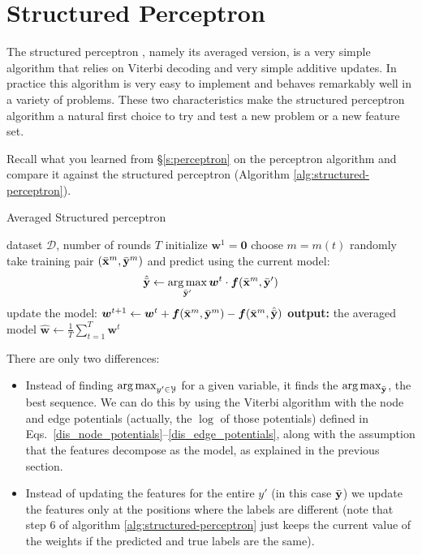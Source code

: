 \section{\label{s:spercetron}Structured Perceptron}

The structured perceptron \citep{collins2002discriminative}, namely its averaged version, is a very simple
algorithm that relies on Viterbi decoding and very simple additive
updates. In practice this algorithm is very easy to implement and
behaves remarkably well in a variety of problems. These two
characteristics make the structured perceptron algorithm a natural
first choice to try and test a new problem or a new feature set. 

Recall what you learned from \S\ref{s:perceptron} on the
perceptron algorithm and compare it against the structured perceptron
(Algorithm \ref{alg:structured-perceptron}). 

\begin{algorithm}[t]
   \caption{Averaged Structured perceptron \label{alg:structured-perceptron}}
\begin{algorithmic}[1]
    dataset $\mathcal{D}$, number of rounds $T$
   \STATE initialize $\boldsymbol{w}^1 = \mathbf{0}$
	\STATE choose $m = m(t)$ randomly
	\STATE take training pair $(\bar{\mathbf{x}}^m, \bar{\mathbf{y}}^m)$ and predict using the current model: 
	$$\hat{\bar{\mathbf{y}}}  \leftarrow \operatorname*{arg\,max}_{\bar{\mathbf{y}}'} \boldsymbol{w}^t \cdot \boldsymbol{f}(\bar{\mathbf{x}}^m,\bar{\mathbf{y}}')$$
	\STATE update the model: 
	$\boldsymbol{w}^{t+1} \leftarrow \boldsymbol{w}^{t} + \boldsymbol{f}(\bar{\mathbf{x}}^m,\bar{\mathbf{y}}^m) - \boldsymbol{f}(\bar{\mathbf{x}}^m,\hat{\bar{\mathbf{y}}})$
	\ENDFOR
   \STATE \textbf{output:} the averaged model $\hat{\boldsymbol{w}} \leftarrow \frac{1}{T}\sum_{t=1}^T \boldsymbol{w}^t$
\end{algorithmic}
\end{algorithm}

There are only two differences:
\begin{itemize}
\item Instead of finding $\operatorname*{arg\,max}_{y'\in\mathcal{Y}}$ for a given
  variable, it finds the $\operatorname*{arg\,max}_{\bar{\mathbf{y}}}$, the best sequence. We can
  do this by using the Viterbi algorithm with the node and edge potentials 
  (actually, the $\log$ of those potentials) defined in Eqs.~\ref{dis_node_potentials}--\ref{dis_edge_potentials}, 
  along with the assumption that the features
  decompose as the model, as explained in the previous section.
\item Instead of updating the features for the entire $y'$ (in this
  case $\bar{\mathbf{y}}$) we update the features only at the positions where the
  labels are different (note that step 6 of algorithm \ref{alg:structured-perceptron} just keeps the current value of the weights if the predicted and true labels are the same).
\end{itemize}


